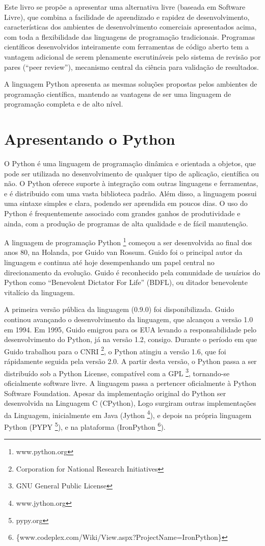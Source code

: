 \documentclass[a4paper,10pt,brazil]{sphinxmanual}
\begin{document}
Este livro se propõe a apresentar uma alternativa livre (baseada em Software Livre), que combina a facilidade de aprendizado e rapidez de desenvolvimento, características dos ambientes de desenvolvimento comerciais apresentados acima, com toda a flexibilidade das linguagens de programação tradicionais. Programas científicos desenvolvidos inteiramente com ferramentas de código aberto tem a vantagem adicional de serem plenamente escrutináveis pelo sistema de revisão por pares (``peer review''), mecanismo central da ciência para validação de resultados.

A linguagem Python apresenta as mesmas soluções propostas pelos ambientes de programação científica, mantendo as vantagens de ser uma linguagem de programação completa e de alto nível.


\section{Apresentando o Python}
\label{Cap1:apresentando-o-python}
O Python é uma linguagem de programação dinâmica e orientada a objetos, que pode ser utilizada no desenvolvimento de qualquer tipo de aplicação, científica ou não. O Python oferece suporte à integração com outras linguagens e ferramentas, e é distribuido com uma vasta biblioteca padrão. Além disso, a linguagem possui uma sintaxe simples e clara, podendo ser aprendida em poucos dias. O uso do Python é frequentemente associado com grandes ganhos de produtividade e ainda, com a produção de programas de alta qualidade e de fácil manutenção.

A linguagem de programação Python \footnote{
www.python.org
} começou a ser desenvolvida ao final dos anos 80, na Holanda, por Guido van Rossum. Guido foi o principal autor da linguagem e continua até hoje desempenhando um papel central no direcionamento da evolução. Guido é reconhecido pela comunidade de usuários do Python como ``Benevolent Dictator For Life'' (BDFL), ou ditador benevolente vitalício da linguagem.

A primeira versão pública da linguagem (0.9.0) foi disponibilizada. Guido continou avançando o desenvolvimento da linguagem, que alcançou a versão 1.0 em 1994. Em 1995, Guido emigrou para os EUA levando a responsabilidade pelo desenvolvimento do Python, já na versão 1.2, consigo. Durante o período em que Guido trabalhou para o CNRI \footnote{
Corporation for National Research Initiatives
}, o Python atingiu a versão 1.6, que foi rápidamente seguida pela versão 2.0. A partir desta versão, o Python passa a ser distribuído sob a Python License, compatível com a GPL \footnote{
GNU General Public License
}, tornando-se oficialmente software livre. A linguagem passa a pertencer oficialmente à Python Software Foundation. Apesar da implementação original do Python ser desenvolvida na Linguagem C (CPython), Logo surgiram outras implementações da Linguagem, inicialmente em Java (Jython \footnote{
www.jython.org
}), e depois na própria linguagem Python (PYPY \footnote{
pypy.org
}), e na plataforma  (IronPython \footnote{
\{www.codeplex.com/Wiki/View.aspx?ProjectName=IronPython\}
}).
\end{document}

